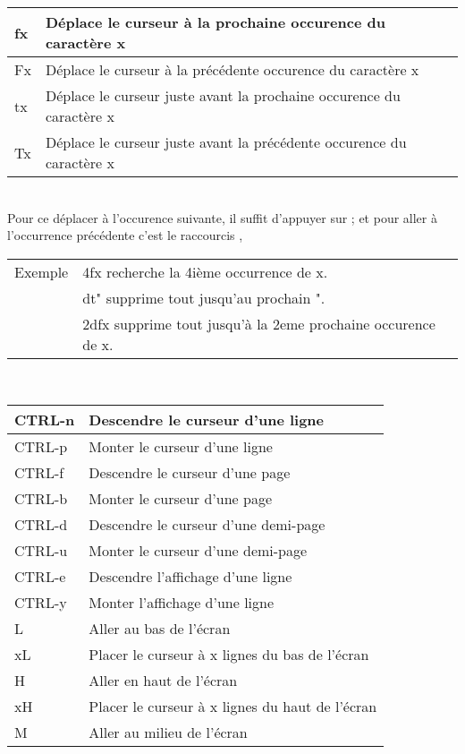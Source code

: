 \documentclass{article}
\begin{document}
\begin{tabular}{|p{3cm}| l| }
\hline
fx & Déplace le curseur à la prochaine occurence du caractère x \\ \hline
Fx & Déplace le curseur à la précédente occurence du caractère x \\ \hline
tx & Déplace le curseur juste avant la prochaine occurence du caractère x \\ \hline
Tx & Déplace le curseur juste avant la précédente occurence du caractère x \\ \hline
\end{tabular}\\

Pour ce déplacer à l'occurence suivante, il suffit d'appuyer sur ; et pour aller à l'occurrence précédente c'est le raccourcis ,
    
\begin{tabular}{l l}
Exemple&	4fx recherche la 4ième occurrence de x.\\
&dt" supprime tout jusqu'au prochain ".\\
&2dfx supprime tout jusqu'à la 2eme prochaine occurence de x.\\
\end{tabular}\\

\begin{tabular}{|p{3cm}| l| }
\hline
CTRL-n & Descendre le curseur d'une ligne \\ \hline
CTRL-p & Monter le curseur d'une ligne\\ \hline
CTRL-f & Descendre le curseur d'une page\\ \hline
CTRL-b & Monter le curseur d'une page\\ \hline
CTRL-d & Descendre le curseur d'une demi-page\\ \hline
CTRL-u & Monter le curseur d'une demi-page\\ \hline
CTRL-e & Descendre l'affichage d'une ligne\\ \hline
CTRL-y & Monter l'affichage d'une ligne\\ \hline
L & Aller au bas de l'écran\\ \hline
xL & Placer le curseur à x lignes du bas de l'écran \\ \hline
H & Aller en haut de l'écran \\ \hline
xH & Placer le curseur à x lignes du haut de l'écran \\ \hline
M & Aller au milieu de l'écran\\ \hline
\end{tabular}\\
\end{document}
